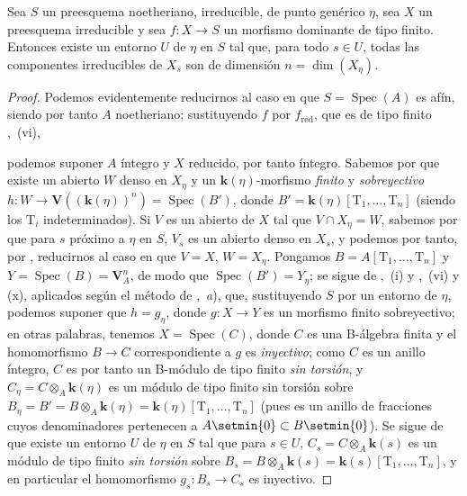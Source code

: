 \begin{corollary}[9.5.6]
\label{IV.9.5.6}
Sea $S$ un preesquema noetheriano, irreducible, de punto genérico $\eta$, sea $X$ un preesquema irreducible y sea $f:X\to S$ un morfismo dominante de tipo finito.
Entonces existe un entorno $U$ de $\eta$ en $S$ tal que, para todo $s\in U$, todas las componentes irreducibles de $X_s$ son de dimensión $n=\dim(X_\eta)$.
\end{corollary}

\begin{proof}
Podemos evidentemente reducirnos al caso en que $S=\operatorname{Spec}(A)$ es afín, siendo por tanto $A$ noetheriano; sustituyendo $f$ por $f_{\mathrm{red}}$, que es de tipo finito ,~(vi),


podemos suponer $A$ íntegro y $X$ reducido, por tanto íntegro.
Sabemos por  que existe un abierto $W$ denso en $X_\eta$ y un $\boldsymbol{k}(\eta)$-morfismo \emph{finito} y \emph{sobreyectivo} $h:W\to\mathbf{V}((\boldsymbol{k}(\eta))^n)=\operatorname{Spec}(B')$, donde $B'=\boldsymbol{k}(\eta)[\mathrm{T}_1,\ldots,\mathrm{T}_n]$ (siendo los $\mathrm{T}_i$ indeterminados).
Si $V$ es un abierto de $X$ tal que $V\cap X_\eta=W$, sabemos por  que para $s$ próximo a $\eta$ en $S$, $V_s$ es un abierto denso en $X_s$, y podemos por tanto, por , reducirnos al caso en que $V=X$, $W=X_\eta$.
Pongamos $B=A[\mathrm{T}_1,\ldots,\mathrm{T}_n]$ y $Y=\operatorname{Spec}(B)=\mathbf{V}_A^n$, de modo que $\operatorname{Spec}(B')=Y_\eta$; se sigue de ,~(i) y ,~(vi) y (x), aplicados según el método de ,~\emph{a}), que, sustituyendo $S$ por un entorno de $\eta$, podemos suponer que $h=g_\eta$, donde $g:X\to Y$ es un morfismo finito sobreyectivo; en otras palabras, tenemos $X=\operatorname{Spec}(C)$, donde $C$ es una B-álgebra finita y el homomorfismo $B\to C$ correspondiente a $g$ es \emph{inyectivo}; como $C$ es un anillo íntegro, $C$ es por tanto un B-módulo de tipo finito \emph{sin torsión}, y $C_\eta=C\otimes_A\boldsymbol{k}(\eta)$ es un módulo de tipo finito sin torsión sobre $B_\eta=B'=B\otimes_A\boldsymbol{k}(\eta)=\boldsymbol{k}(\eta)[\mathrm{T}_1,\ldots,\mathrm{T}_n]$ (pues es un anillo de fracciones cuyos denominadores pertenecen a $A\setmin\{0\}\subset B\setmin\{0\}$).
Se sigue de  que existe un entorno $U$ de $\eta$ en $S$ tal que para $s\in U$, $C_s=C\otimes_A\boldsymbol{k}(s)$ es un módulo de tipo finito \emph{sin torsión} sobre $B_s=B\otimes_A\boldsymbol{k}(s)=\boldsymbol{k}(s)[\mathrm{T}_1,\ldots,\mathrm{T}_n]$, y en particular el homomorfismo $g_s:B_s\to C_s$ es inyectivo.

\end{proof}
